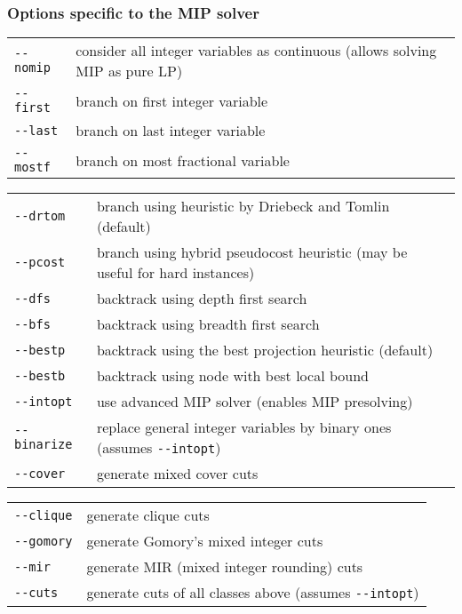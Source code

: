 \subsubsection*{Options specific to the MIP solver}

\noindent
\begin{tabular}{@{}p{30mm}p{92.3mm}@{}}
\verb|--nomip|    &  consider all integer variables as continuous
                     (allows solving MIP as pure LP) \\
\verb|--first|    &  branch on first integer variable \\
\verb|--last|     &  branch on last integer variable \\
\verb|--mostf|    &  branch on most fractional variable \\
\end{tabular}

\noindent
\begin{tabular}{@{}p{30mm}p{92.3mm}@{}}
\verb|--drtom|    &  branch using heuristic by Driebeck and Tomlin
                     (default) \\
\verb|--pcost|    &  branch using hybrid pseudocost heuristic (may be
                     useful for hard instances) \\
\verb|--dfs|      &  backtrack using depth first search \\
\verb|--bfs|      &  backtrack using breadth first search \\
\verb|--bestp|    &  backtrack using the best projection heuristic
                     (default) \\
\verb|--bestb|    &  backtrack using node with best local bound \\
\verb|--intopt|   &  use advanced MIP solver (enables MIP presolving)\\
\verb|--binarize| &  replace general integer variables by binary ones
                     (assumes \verb|--intopt|)\\
\verb|--cover|    &  generate mixed cover cuts\\
\end{tabular}

\noindent
\begin{tabular}{@{}p{30mm}p{92.3mm}@{}}
\verb|--clique|   &  generate clique cuts\\
\verb|--gomory|   &  generate Gomory's mixed integer cuts\\
\verb|--mir|      &  generate MIR (mixed integer rounding) cuts\\
\verb|--cuts|     &  generate cuts of all classes above (assumes
                     \verb|--intopt|)\\
\end{tabular}

